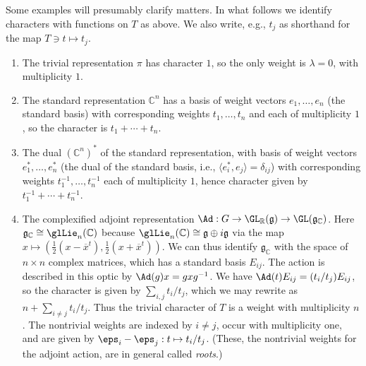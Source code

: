 \documentclass[reqno]{amsart} 
\begin{document}
Some examples will presumably clarify matters.  In what follows we identify characters with functions on $T$ as above.  We also write, e.g., $t_j$ as shorthand for the map $T \ni t \mapsto t_j$.
\begin{example}
  \begin{enumerate}
  \item The trivial representation $\pi$ has character $1$, so the only weight is $\lambda = 0$, with multiplicity $1$.
  \item The standard representation $\mathbb{C}^n$ has a basis of weight vectors $e_1,\dotsc,e_n$ (the standard basis) with corresponding weights $t_1,\dotsc,t_n$ and each of multiplicity $1$, so the character is $t_1 + \dotsb + t_n$.
  \item The dual $(\mathbb{C}^n)^*$ of the standard representation, with basis of weight vectors $e_1^*,\dotsc,e_n^*$ (the dual of the standard basis, i.e., $\langle e_i^*, e_j \rangle = \delta_{i j}$) with corresponding weights $t_1^{-1},\dotsc,t_n^{-1}$ each of multiplicity $1$, hence character given by $t_1^{-1} + \dotsb + t_n^{-1}$.
  \item The complexified adjoint representation $\Ad : G \rightarrow \GL_{\mathbb{R}}(\mathfrak{g}) \rightarrow \GL(\mathfrak{g}_{\mathbb{C}})$.  Here $\mathfrak{g}_{\mathbb{C}} \cong \glLie_n(\mathbb{C})$ because $\glLie_n(\mathbb{C}) \cong \mathfrak{g} \oplus i \mathfrak{g}$ via the map $x \mapsto (\tfrac{1}{2} (x - \overline{x}^t), \tfrac{1}{2} (x + \overline{x}^t))$.  We can thus identify $\mathfrak{g}_{\mathbb{C}}$ with the space of $n \times n$ complex matrices, which has a standard basis $E_{i j}$.  The action is described in this optic by $\Ad(g) x = g x g^{-1}$.  We have $\Ad(t) E_{i j} = (t_i/t_j) E_{i j}$, so the character is given by $\sum_{i,j} t_i/t_j$, which we may rewrite as $n + \sum_{i \neq j} t_i/t_j$.  Thus the trivial character of $T$ is a weight with multiplicity $n$.  The nontrivial weights are indexed by $i \neq j$, occur with multiplicity one, and are given by $\eps_i - \eps_j : t \mapsto t_i/t_j$.  (These, the nontrivial weights for the adjoint action, are in general called \emph{roots}.)
    

\end{enumerate}
\end{example}
\end{document}
